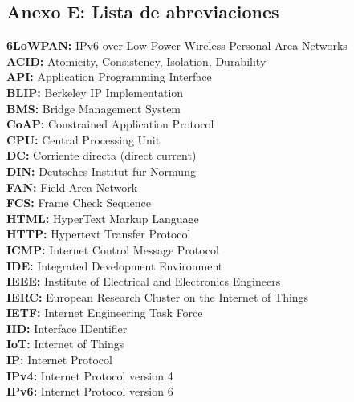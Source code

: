 \subsection*{Anexo E: Lista de abreviaciones}
\label{anexo-e}

\vspace{0.5cm}

\begin{spacing}{1.2}
\textbf{6LoWPAN:} IPv6 over Low-Power Wireless Personal Area Networks\\
\textbf{ACID:} Atomicity, Consistency, Isolation, Durability\\ 
\textbf{API:} Application Programming Interface\\
\textbf{BLIP:} Berkeley IP Implementation\\
\textbf{BMS:} Bridge Management System\\
\textbf{CoAP:} Constrained Application Protocol\\
\textbf{CPU:} Central Processing Unit\\
\textbf{DC:} Corriente directa (direct current)\\
\textbf{DIN:} Deutsches Institut für Normung\\
\textbf{FAN:} Field Area Network\\
\textbf{FCS:} Frame Check Sequence\\
\textbf{HTML:} HyperText Markup Language\\
\textbf{HTTP:} Hypertext Transfer Protocol\\
\textbf{ICMP:} Internet Control Message Protocol\\
\textbf{IDE:} Integrated Development Environment\\
\textbf{IEEE:} Institute of Electrical and Electronics Engineers\\
\textbf{IERC:} European Research Cluster on the Internet of Things\\
\textbf{IETF:} Internet Engineering Task Force\\
\textbf{IID:} Interface IDentifier\\
\textbf{IoT:} Internet of Things\\
\textbf{IP:} Internet Protocol\\
\textbf{IPv4:} Internet Protocol version 4\\
\textbf{IPv6:} Internet Protocol version 6\\

\end{spacing}
